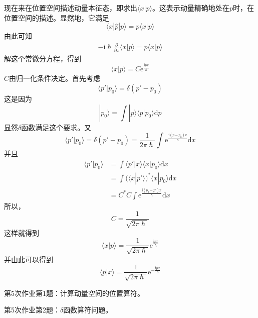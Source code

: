         现在来在位置空间描述动量本征态，即求出$\langle x|p \rangle$。这表示动量精确地处在$p$时，在位置空间的描述。显然地，它满足
        \begin{equation}
            \langle x|\hat{p}|p\rangle = p\langle x|p \rangle
        \end{equation}
        由此可知 
        \begin{equation}\begin{aligned}
            -\mathrm{i}\hslash \frac {\partial}{\partial x} \langle x|p \rangle = p \langle x|p \rangle
        \end{aligned}\end{equation}
        解这个常微分方程，得到
        \begin{equation}
            \langle x|p \rangle = C \mathrm{e}^{\frac {\mathrm{i}px}\hslash}
        \end{equation}
        $C$由归一化条件决定。首先考虑
        \begin{equation}
            \langle p' | p_0 \rangle = \delta (p'-p_0)
        \end{equation}
        这是因为
        \begin{equation}
            |p_0 \rangle = \int |p\rangle \langle p|p_0\rangle \mathrm{d}p
        \end{equation}
        显然$\delta$函数满足这个要求。又
        \begin{equation}
            \langle p' | p_0 \rangle = \delta (p'-p_0) = \frac 1{2\pi\hslash} \int \mathrm{e}^{\frac {\mathrm{i}(p-p_0)x}{\hslash}} \mathrm{d}x
        \end{equation}
        并且
        \begin{equation}\begin{aligned}
            \langle p'|p_0 \rangle &= \int \langle p'|x\rangle \langle x|p_0 \rangle \mathrm{d}x\\
            &= \int (\langle x|p' \rangle)^* \langle x|p_0 \rangle \mathrm{d}x\\
            &= C^*C\int \mathrm{e}^{\frac {\mathrm{i}(p_0-p')x}{\hslash}} \mathrm{d}x
        \end{aligned}\end{equation}
        所以， 
        \begin{equation}
            C = \frac 1{\sqrt{2\pi\hslash}}
        \end{equation}
        这样就得到 
        \begin{equation}
            \langle x|p \rangle = \frac 1{\sqrt{2\pi\hslash}} \mathrm{e}^{\frac {\mathrm{i}px}{\hslash}}
        \end{equation}
        并由此可以得到
        \begin{equation}
            \langle p|x \rangle = \frac 1{\sqrt{2\pi\hslash}} \mathrm{e}^{-\frac {\mathrm{i}px}{\hslash}}
        \end{equation}
        \begin{asg}
            第5次作业第1题：计算动量空间的位置算符。
        \end{asg}
        \begin{asg}
            第5次作业第2题：$\delta$函数算符问题。
        \end{asg}

